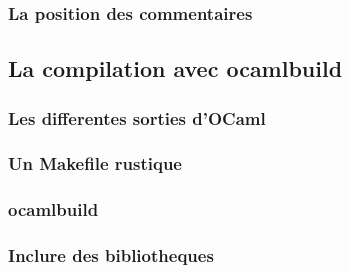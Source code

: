 \begin{frame}
	\frametitle{La position des commentaires}

\end{frame}

\subsection{La compilation avec ocamlbuild} %
\begin{frame}
	\frametitle{Les differentes sorties d'OCaml}

\end{frame}

\begin{frame}
	\frametitle{Un Makefile rustique}

\end{frame}

\begin{frame}
	\frametitle{ocamlbuild}

\end{frame}

\begin{frame}
	\frametitle{Inclure des bibliotheques}

\end{frame}
